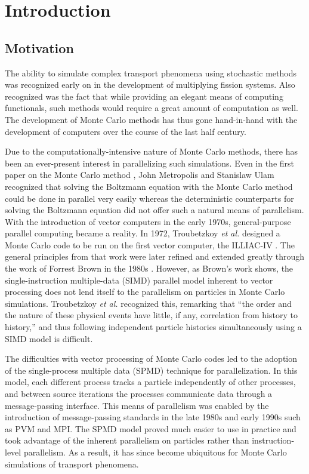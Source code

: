 \chapter{Introduction}

\newcommand{\rb}{\mathbf{r}}
\newcommand{\Omegab}{\mathbf{\Omega}}
\newcommand{\phasespace}{\mathbf{r},E,\mathbf{\Omega}}

\section{Motivation}

The ability to simulate complex transport phenomena using stochastic
methods was recognized early on in the development of multiplying
fission systems. Also recognized was the fact that while providing an
elegant means of computing functionals, such methods would require a
great amount of computation as well. The development of Monte Carlo
methods has thus gone hand-in-hand with the development of computers
over the course of the last half century.

Due to the computationally-intensive nature of Monte Carlo methods,
there has been an ever-present interest in parallelizing such
simulations. Even in the first paper on the Monte Carlo method
\cite{metropolis}, John Metropolis and Stanislaw Ulam recognized that
solving the Boltzmann equation with the Monte Carlo method could be
done in parallel very easily whereas the deterministic counterparts
for solving the Boltzmann equation did not offer such a natural means
of parallelism. With the introduction of vector computers in the early
1970s, general-purpose parallel computing became a reality. In 1972,
Troubetzkoy {\em et al.}  designed a Monte Carlo code to be run on the
first vector computer, the ILLIAC-IV \cite{troubetzkoy}. The general
principles from that work were later refined and extended greatly
through the work of Forrest Brown in the 1980s
\cite{brown-vector}. However, as Brown's work shows, the
single-instruction multiple-data (SIMD) parallel model inherent to
vector processing does not lend itself to the parallelism on particles
in Monte Carlo simulations. Troubetzkoy {\em et al.} recognized this,
remarking that ``the order and the nature of these physical events
have little, if any, correlation from history to history,'' and thus
following independent particle histories simultaneously using a SIMD
model is difficult.

The difficulties with vector processing of Monte Carlo codes led to
the adoption of the single-process multiple data (SPMD) technique for
parallelization. In this model, each different process tracks a
particle independently of other processes, and between source
iterations the processes communicate data through a message-passing
interface. This means of parallelism was enabled by the
introduction of message-passing standards in the late 1980s and early
1990s such as PVM and MPI. The SPMD model proved much easier to use in
practice and took advantage of the inherent parallelism on particles
rather than instruction-level parallelism. As a result, it has since
become ubiquitous for Monte Carlo simulations of transport phenomena.

